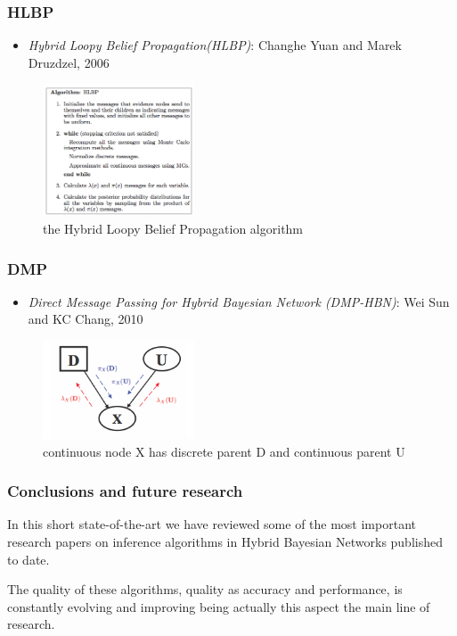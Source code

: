 \documentclass{beamer}
\begin{document}
\begin{frame}
	\frametitle{HLBP}

	\begin{itemize}
		\item \textit{Hybrid Loopy Belief Propagation(HLBP)}: Changhe Yuan and Marek Druzdzel, 2006
	\end{itemize}
	\begin{figure}
		  	\centering
    			\includegraphics[width=0.4\textwidth]{hlbp.png}
  			\caption{the Hybrid Loopy Belief Propagation algorithm}
	\end{figure}
\end{frame}

\begin{frame}
	\frametitle{DMP}
	\begin{itemize}
		\item \textit{Direct Message Passing for Hybrid Bayesian Network (DMP-HBN)}: Wei Sun and KC Chang, 2010 
	\end{itemize}
	\begin{figure}
		  	\centering
    			\includegraphics[width=0.4\textwidth]{dmp.png}
  			\caption{continuous node X has discrete parent D and continuous parent U}
	\end{figure}
\end{frame}

\begin{frame}
	\frametitle{Conclusions and future research}
In this short state-of-the-art we have reviewed some of the most important research papers on inference algorithms in Hybrid Bayesian Networks published to date.

The quality of these algorithms, quality as accuracy and performance, is constantly evolving and improving being actually this aspect the main line of research.
\end{frame}
\end{document}
